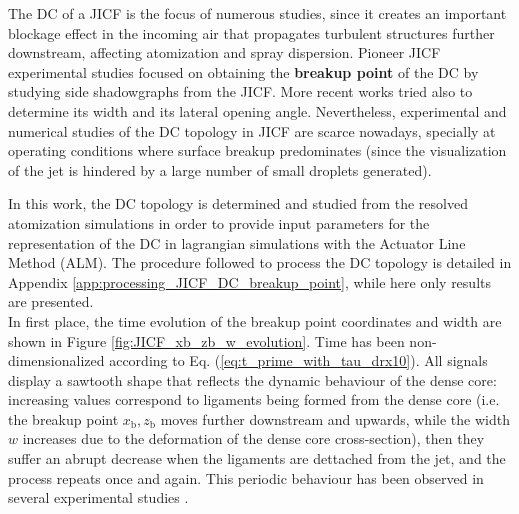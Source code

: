 The DC of a JICF is the focus of numerous studies, since it creates an important blockage effect in the incoming air that propagates turbulent structures further downstream, affecting atomization and spray dispersion. Pioneer JICF experimental studies \citepColor[wu_breakup_1997] focused on obtaining the \textbf{breakup point} of the DC by studying side shadowgraphs from the JICF. More recent works  tried also to determine its width and its lateral opening angle. Nevertheless, experimental and numerical studies of the DC topology in JICF are scarce nowadays, specially at operating conditions where surface breakup predominates (since the visualization of the jet is hindered by a large number of small droplets generated).

In this work, the DC topology is determined and studied from the resolved atomization simulations in order to provide input parameters for the representation of the DC in lagrangian simulations with the Actuator Line Method (ALM). The procedure followed to process the DC topology is detailed in Appendix \ref{app:processing_JICF_DC_breakup_point}, while here only results are presented. \\



In first place, the time evolution of the breakup point coordinates and width are shown in Figure \ref{fig:JICF_xb_zb_w_evolution}. Time has been non-dimensionalized according to Eq. (\ref{eq:t_prime_with_tau_drx10}). All signals display a sawtooth shape that reflects the dynamic behaviour of the dense core: increasing values correspond to ligaments being formed from the dense core (i.e. the breakup point $x_\mathrm{b}, z_\mathrm{b}$ moves further downstream and upwards, while the width $w$ increases due to the deformation of the dense core cross-section), then they suffer an abrupt decrease when the ligaments are dettached from the jet, and the process repeats once and again.  This periodic behaviour has been observed in several experimental studies  .

